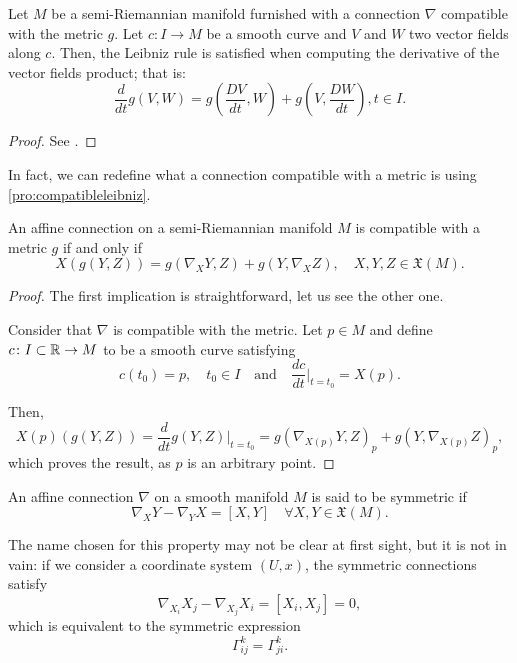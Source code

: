 \begin{proposition}
	\label{pro:compatibleleibniz}
	Let $M$ be a semi-Riemannian manifold furnished with a connection $\nabla$ compatible with the metric $g$. Let $c \colon I \to M$ be a smooth curve and $V$ and $W$ two vector fields along $c$. Then, the Leibniz rule is satisfied when computing the derivative of the vector fields product; that is:
	\[
		\frac{d}{dt}g(V,W) = g(\frac{DV}{dt}, W) + g(V, \frac{DW}{dt}), t \in I.
	\]
\end{proposition}

\begin{proof}
	See \cite[Ch. 2, Section 3, Proposition 3.2]{docarmo79}.
\end{proof}

In fact, we can redefine what a connection compatible with a metric is using \autoref{pro:compatibleleibniz}.

\begin{corollary}
	An affine connection on a semi-Riemannian manifold $M$ is compatible with a metric $g$ if and only if
	\[
		X(g(Y,Z)) = g(\nabla_X Y, Z) + g(Y, \nabla_X Z), \quad X, Y, Z \in \mathfrak{X}(M).
	\]
\end{corollary}

\begin{proof}
	The first implication is straightforward, let us see the other one.

	Consider that $\nabla$ is compatible with the metric. Let $p \in M$ and define $c \colon I \subset \mathbb{R} \to M$ to be a smooth curve satisfying
	\[
		c(t_0) = p, \quad t_0 \in I \quad \textrm{and} \quad \frac{dc}{dt} \Bigr|_{t = t_0} = X(p).
	\]
	
	Then,
	\[
		X(p)\left(g(Y,Z)\right) = \frac{d}{dt}g(Y,Z)\Bigr|_{t=t_0} = g(\nabla_{X(p)} Y, Z)_p + g(Y, \nabla_{X(p)} Z)_p,
	\]
	which proves the result, as $p$ is an arbitrary point.
\end{proof}

\begin{definition}
	An affine connection $\nabla$ on a smooth manifold $M$ is said to be symmetric if
	\[
		\nabla_X Y - \nabla_Y X = [X, Y] \quad \forall X,Y \in \mathfrak{X}(M).
	\]
\end{definition}

The name chosen for this property may not be clear at first sight, but it is not in vain: if we consider a coordinate system $(U,x)$, the symmetric connections satisfy
\[
	\nabla_{X_i} X_j - \nabla_{X_j} X_i = [X_i, X_j] = 0,
\]
which is equivalent to the symmetric expression
\[
	\Gamma^k_{ij} = \Gamma^k_{ji}.
\]

